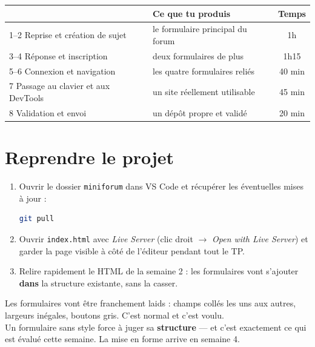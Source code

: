 \documentclass[a4paper,11pt]{article}
\newcommand{\hdr}[1]{\multicolumn{1}{l}{\color{white}\bfseries #1}}
\newcommand{\hdrc}[1]{\multicolumn{1}{c}{\color{white}\bfseries #1}}
\renewcommand{\arraystretch}{1.3}
\begin{document}
\vspace{4pt}
\begin{center}
\renewcommand{\arraystretch}{1.0}
\begin{tabularx}{\linewidth}{p{6.4cm}Xc}
  \toprule
  \rowcolor{uniNavy}
  \hdr{Étape} & \hdr{Ce que tu produis} & \hdrc{Temps} \\
  \midrule
  \rowcolor{uniPaper}
  1--2 \quad Reprise et création de sujet & le formulaire principal du forum & 1h \\
  3--4 \quad Réponse et inscription & deux formulaires de plus & 1h15 \\
  \rowcolor{uniPaper}
  5--6 \quad Connexion et navigation & les quatre formulaires reliés & 40 min \\
  7 \quad\; Passage au clavier et aux DevTools & un site réellement utilisable & 45 min \\
  \rowcolor{uniPaper}
  8 \quad\; Validation et envoi & un dépôt propre et validé & 20 min \\
  \bottomrule
\end{tabularx}
\end{center}

\section{Reprendre le projet}

\begin{enumerate}
  \item Ouvrir le dossier \texttt{miniforum} dans VS Code et récupérer les éventuelles mises à jour :
\begin{lstlisting}[language=bash, numbers=none]
git pull
\end{lstlisting}
  \item Ouvrir \texttt{index.html} avec \textit{Live Server} (clic droit $\rightarrow$ \textit{Open with Live Server}) et garder la page visible à côté de l'éditeur pendant tout le TP.
  \item Relire rapidement le HTML de la semaine 2 : les formulaires vont s'ajouter \textbf{dans} la structure existante, sans la casser.
\end{enumerate}

\begin{tcolorbox}[attention, title={Toujours pas de CSS}]
Les formulaires vont être franchement laids : champs collés les uns aux autres, largeurs inégales, boutons gris. C'est normal et c'est voulu.\\[4pt]
Un formulaire sans style force à juger sa \textbf{structure} --- et c'est exactement ce qui est évalué cette semaine. La mise en forme arrive en semaine 4.
\end{tcolorbox}
\end{document}
